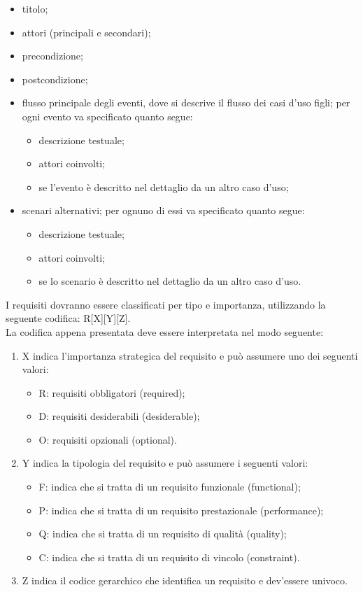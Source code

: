 			\begin{itemize}
				\item titolo;
				\item attori (principali e secondari);
				\item precondizione;
				\item postcondizione;
				\item flusso principale degli eventi, dove si descrive il flusso dei casi d'uso figli; per ogni evento va specificato quanto segue:
				\begin{itemize}
					\item descrizione testuale;
					\item attori coinvolti;
					\item se l’evento è descritto nel dettaglio da un altro caso d’uso;
				\end{itemize}
				\item scenari alternativi; per ognuno di essi va specificato quanto segue:
				\begin{itemize}
					\item descrizione testuale;
					\item attori coinvolti;
					\item se lo scenario è descritto nel dettaglio da un altro caso d’uso.
				\end{itemize}
			\end{itemize}
			I requisiti dovranno essere classificati per tipo e importanza, utilizzando la seguente codifica: R[X][Y][Z].\\
			La codifica appena presentata deve essere interpretata nel modo seguente:
			\begin{enumerate}
				\item X indica l'importanza strategica del requisito e può assumere uno dei seguenti valori:
				\begin{itemize}
					\item R: requisiti obbligatori (required);
					\item D: requisiti desiderabili (desiderable);
					\item O: requisiti opzionali (optional).
				\end{itemize}
				\item Y indica la tipologia del requisito e può assumere i seguenti valori:
				\begin{itemize}
					\item F: indica che si tratta di un requisito funzionale (functional);
					\item P: indica che si tratta di un requisito prestazionale (performance);
					\item Q: indica che si tratta di un requisito di qualità (quality);
					\item C: indica che si tratta di un requisito di vincolo (constraint).
				\end{itemize}
				\item Z indica il codice gerarchico che identifica un requisito e dev'essere univoco.
			\end{enumerate}
